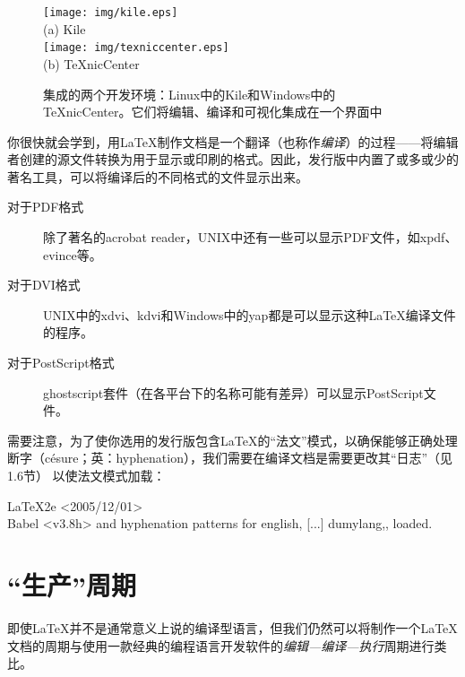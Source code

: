 \begin{figure}%
    \centering
    \texttt{[image: img/kile.eps]}\\
    (a) Kile\\
    \texttt{[image: img/texniccenter.eps]}\\
    (b) \TeX nicCenter
    \caption{集成的两个开发环境：Linux中的Kile和Windows中的\TeX nicCenter。它们将编辑、编译和可视化集成在一个界面中}
    \label{fig:1.1}
\end{figure}

你很快就会学到，用\LaTeX 制作文档是一个翻译（也称作\textit{编译}）的过程——将编辑者创建的源文件转换为用于显示或印刷的格式。因此，发行版中内置了或多或少的著名工具，可以将编译后的不同格式的文件显示出来。

\begin{description}

\item[对于PDF格式]除了著名的\textsf{acrobat reader}，UNIX中还有一些可以显示PDF文件，如\textsf{xpdf}、\textsf{evince}等。

\item[对于DVI格式]UNIX中的\textsf{xdvi}、\textsf{kdvi}和Windows中的\textsf{yap}都是可以显示这种\LaTeX 编译文件的程序。

\item[对于PostScript格式]\textsf{ghostscript}套件（在各平台下的名称可能有差异）可以显示PostScript文件。

\end{description}

\begin{exclamation}
    需要注意，为了使你选用的发行版包含\LaTeX 的“法文”模式，以确保能够正确处理断字（césure；英：hyphenation），我们需要在编译文档是需要更改其“日志”（见1.6节）%
    以使法文模式加载：

    \begin{dmd}
    LaTeX2e <2005/12/01>\\
    Babel <v3.8h> and hyphenation patterns for english, [...] dumylang,\linebreak {}, loaded.
    \end{dmd}
\end{exclamation}

\section{“生产”周期}

即使\LaTeX 并不是通常意义上说的编译型语言，但我们仍然可以将制作一个\LaTeX 文档的周期与使用一款经典的编程语言开发软件的\textit{编辑—编译—执行}周期进行类比。

